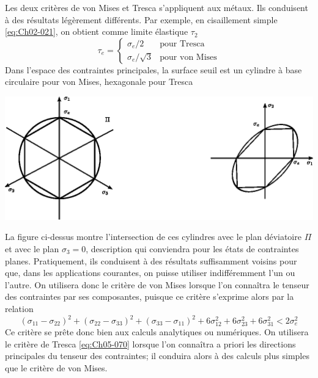 Les deux critères de von Mises et Tresca s'appliquent aux métaux.
Ils conduisent à des résultats légèrement différents.
Par exemple, en cisail­lement simple \eqref{eq:Ch02-021}, on obtient comme limite élastique $\tau_2$
\begin{equation}
    \tau_e = 
    \begin{cases}
        \sigma_e /2 & \text{pour Tresca} \\
        \sigma_e /\sqrt{3} & \text{pour von Mises}
    \end{cases}
    \label{eq:Ch05-071}
\end{equation}
Dans l'espace des contraintes principales, la surface seuil est un cylindre à base circulaire pour von Mises, hexagonale pour Tresca 
\begin{center}
    \includegraphics{../images/T1_Ch05-06}
\end{center}
La figure ci-dessus montre l'intersection de ces cylindres avec le plan déviatoire $\Pi$ et avec le plan $\sigma_3=0$, description qui conviendra pour les états de contraintes planes.
Pratiquement, ils conduisent à des résultats suffisamment voisins pour que, dans les applications courantes, on puisse utiliser indifféremment l'un ou l'autre.
On utilisera donc le critère de von Mises lorsque l'on connaîtra le tenseur des contraintes par ses composantes, puisque ce critère s'exprime alors par la relation 
\begin{equation}
    \left( \sigma_{11} - \sigma_{22} \right)^2 + \left( \sigma_{22} - \sigma_{33} \right)^2 + \left( \sigma_{33} - \sigma_{11} \right)^2 + 6\sigma_{12}^2 + 6 \sigma_{23}^2 + 6\sigma_{31}^2 < 2 \sigma_e^2
    \label{eq:Ch05-072}
\end{equation}
Ce critère se prête donc bien aux calculs analytiques ou numériques. On uti­lisera le critère de Tresca \eqref{eq:Ch05-070} lorsque l'on connaîtra a priori les direc­tions principales du tenseur des contraintes; il conduira alors à des calculs plus simples que le critère de von Mises. 

